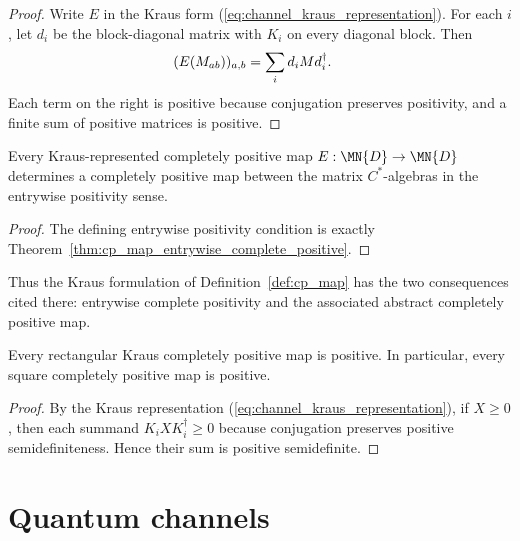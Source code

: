 \begin{proof}\leanok
    Write $E$ in the Kraus form (\ref{eq:channel_kraus_representation}).
    For each $i$, let $d_i$ be the block-diagonal matrix with $K_i$ on every
    diagonal block. Then
    \begin{align}
        (E(M_{ab}))_{a,b}
         & =\sum_i d_i M d_i^\dagger.
        \notag
    \end{align}
    Each term on the right is positive because conjugation preserves
    positivity, and a finite sum of positive matrices is positive.
\end{proof}

\begin{theorem}
    \label{thm:cp_map_to_abstract_completely_positive}
    \leanok
    Every Kraus-represented completely positive map
    $E : \MN{D} \to \MN{D}$ determines a completely positive map between
    the matrix $C^*$-algebras in the entrywise positivity sense.
\end{theorem}

\begin{proof}\leanok
    The defining entrywise positivity condition is exactly
    Theorem~\ref{thm:cp_map_entrywise_complete_positive}.
\end{proof}

Thus the Kraus formulation of Definition~\ref{def:cp_map} has the two
consequences cited there: entrywise complete positivity and the associated
abstract completely positive map.

\begin{theorem}\label{thm:cp_is_positive}
    \leanok
    Every rectangular Kraus completely positive map is positive. In particular,
    every square completely positive map is positive.
\end{theorem}

\begin{proof}\leanok
    By the Kraus representation (\ref{eq:channel_kraus_representation}), if
    $X \ge 0$, then each summand $K_i X K_i^\dagger \ge 0$ because
    conjugation preserves positive semidefiniteness. Hence their sum is
    positive semidefinite.
\end{proof}

\section{Quantum channels}

